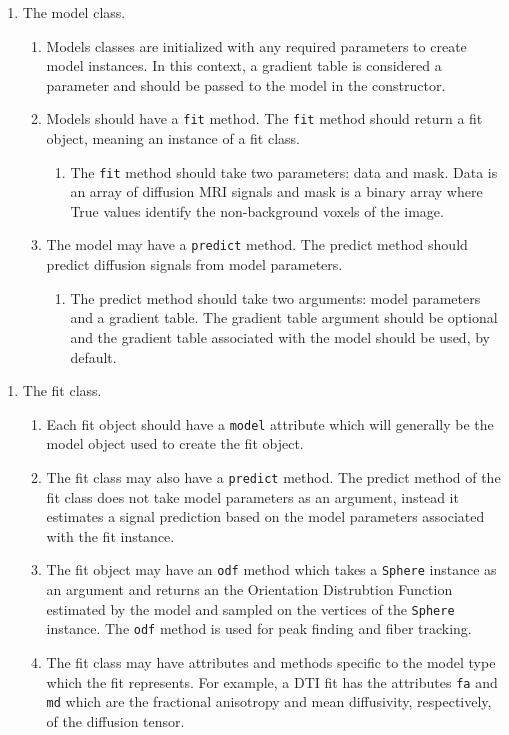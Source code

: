 \begin{enumerate}
\item The model class.
\begin{enumerate}
\item Models classes are initialized with any required parameters to create model instances. In this context, a gradient table is considered a parameter and should be passed to the model in the constructor.
\item Models should have a \texttt{fit} method. The \texttt{fit} method should return a fit object, meaning an instance of a fit class.
\begin{enumerate}
\item The \texttt{fit} method should take two parameters: data and mask. Data is an array of diffusion MRI signals and mask is a binary array where True values identify the non-background voxels of the image.
\end{enumerate}
\item The model may have a \texttt{predict} method. The predict method should predict diffusion signals from model parameters.
\begin{enumerate}
\item The predict method should take two arguments: model parameters and a gradient table. The gradient table argument should be optional and the gradient table associated with the model should be used, by default.
\end{enumerate}
\end{enumerate}
\end{enumerate}
\begin{enumerate}
    \item The fit class.
    \begin{enumerate}
        \item Each fit object should have a \texttt{model} attribute which will generally be the model object used to create the fit object.
        \item The fit class may also have a \texttt{predict} method. The predict method of the fit class does not take model parameters as an argument, instead it estimates a signal prediction based on the model parameters associated with the fit instance.
        \item The fit object may have an \texttt{odf} method which takes a \texttt{Sphere} instance as an argument and returns an the Orientation Distrubtion Function estimated by the model and sampled on the vertices of the \texttt{Sphere} instance. The \texttt{odf} method is used for peak finding and fiber tracking.
        \item The fit class may have attributes and methods specific to the model type which the fit represents. For example, a DTI fit has the attributes \texttt{fa} and \texttt{md} which are the fractional anisotropy and mean diffusivity, respectively, of the diffusion tensor.
    \end{enumerate}
\end{enumerate}

